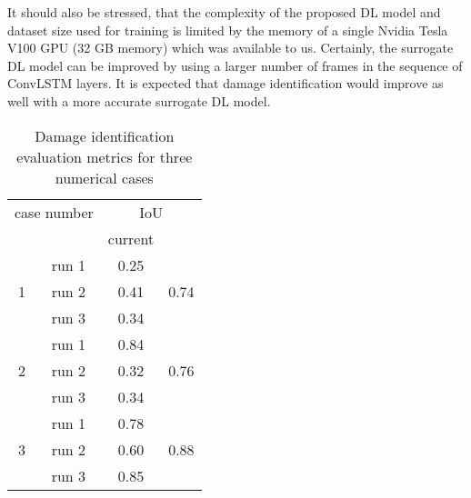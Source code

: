 It should also be stressed, that the complexity of the proposed DL model and dataset size used for training is limited by the memory of a single Nvidia Tesla V100 GPU (32 GB memory) which was available to us.
Certainly, the surrogate DL model can be improved by using a larger number of frames in the sequence of ConvLSTM layers. 
It is expected that damage identification would improve as well with a more accurate surrogate DL model.

\begin{table}[ht]
	\centering
	\caption{Damage identification evaluation metrics for three numerical cases}
	\begin{tabular}{@{}cccc@{}}
		\toprule
		\multicolumn{2}{c}{case number}       & \multicolumn{2}{c}{IoU} \\ 
		\cmidrule(lr){3-4} 
		& & current & \cite{Ullah2023}\\
		\midrule
		\multirow{3}{*}{1} & run 1    & 0.25 & \multirow{3}{*}{0.74}       \\ 
						   & run 2    & 0.41 &        \\ 
						   & run 3    & 0.34 &        \\ 
		\midrule
		\multirow{3}{*}{2} & run 1    & 0.84 & \multirow{3}{*}{0.76}       \\ 
		                   & run 2    & 0.32 &        \\ 
		                   & run 3    & 0.34 &        \\ 
		\midrule
		\multirow{3}{*}{3} & run 1     & 0.78 & \multirow{3}{*}{0.88}       \\ 
		                   & run 2     & 0.60 &        \\ 
		                   & run 3     & 0.85 &        \\ 
		\bottomrule
	\end{tabular}
	\label{tab:iou}
\end{table}
